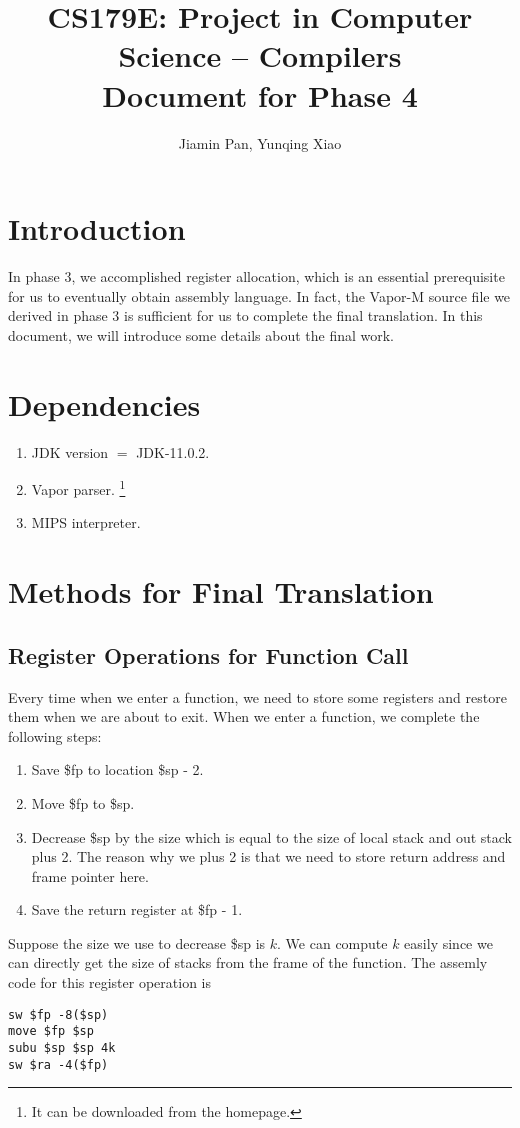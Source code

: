 \documentclass[letterpaper, 14pt]{article}
\begin{document}
\title{CS179E: Project in Computer Science -- Compilers\\ Document for Phase 4}
\author{Jiamin Pan, Yunqing Xiao}
\date{}
\maketitle

\section{Introduction}

In phase 3, we accomplished register allocation, which is an essential prerequisite for us to eventually obtain assembly language. In fact, the Vapor-M source file we derived in phase 3 is sufficient for us to complete the final translation. In this document, we will introduce some details about the final work. 

\section{Dependencies}

\begin{enumerate}
\item JDK version $=$ JDK-11.0.2. 
\item Vapor parser. \footnote{It can be downloaded from the homepage. }
\item MIPS interpreter. 
\end{enumerate}

\section{Methods for Final Translation}

\subsection{Register Operations for Function Call}

Every time when we enter a function, we need to store some registers and restore them when we are about to exit. When we enter a function, we complete the following steps:
\begin{enumerate}
\item Save \$fp to location \$sp - 2. 
\item Move \$fp to \$sp. 
\item Decrease \$sp by the size which is equal to the size of local stack and out stack plus 2. The reason why we plus 2 is that we need to store return address and frame pointer here. 
\item Save the return register at \$fp - 1. 
\end{enumerate}
Suppose the size we use to decrease \$sp is $k$. We can compute $k$ easily since we can directly get the size of stacks from the frame of the function. The assemly code for this register operation is
\begin{lstlisting}
sw $fp -8($sp)
move $fp $sp
subu $sp $sp 4k
sw $ra -4($fp)
\end{lstlisting}
\end{document}
